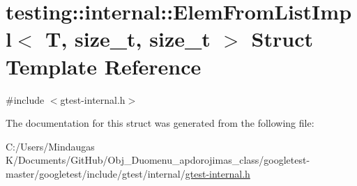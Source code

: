 \hypertarget{structtesting_1_1internal_1_1_elem_from_list_impl}{}\section{testing\+::internal\+::Elem\+From\+List\+Impl$<$ T, size\+\_\+t, size\+\_\+t $>$ Struct Template Reference}
\label{structtesting_1_1internal_1_1_elem_from_list_impl}


{\ttfamily \#include $<$gtest-\/internal.\+h$>$}



The documentation for this struct was generated from the following file\+:\begin{DoxyCompactItemize}
\item 
C\+:/\+Users/\+Mindaugas K/\+Documents/\+Git\+Hub/\+Obj\+\_\+\+Duomenu\+\_\+apdorojimas\+\_\+class/googletest-\/master/googletest/include/gtest/internal/\mbox{\hyperlink{googletest-master_2googletest_2include_2gtest_2internal_2gtest-internal_8h}{gtest-\/internal.\+h}}\end{DoxyCompactItemize}
